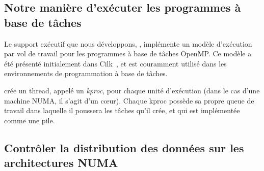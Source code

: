 \documentclass[parallelisme]{compas2016}
\begin{document}





\subsection{Notre manière d'exécuter les programmes à base de tâches}

Le support exécutif que nous développons, \kaapi, implémente un modèle d'exécution par vol
de travail pour les programmes à base de tâches OpenMP. Ce modèle a été présenté
initialement dans Cilk~\cite{cilk5}, et est couramment utilisé dans les environnements
de programmation à base de tâches.

\kaapi crée un thread, appelé un \emph{kproc}, pour chaque unité d'exécution
(dans le cas d'une machine NUMA, il s'agit d'un cœur).
Chaque kproc possède sa propre queue de travail dans laquelle il poussera les
tâches qu'il crée, et qui est implémentée comme une pile.

\subsection{Contrôler la distribution des données sur les architectures NUMA}
\end{document}
